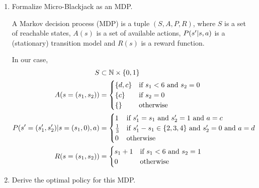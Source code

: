\documentclass[11pt, a4paper]{article}
\begin{document}
\begin{enumerate}
    \item Formalize Micro-Blackjack as an MDP.

    \begin{solution}
        A Markov decision process (MDP) is a tuple $(S, A, P, R)$, where $S$ is a set of reachable states, $A(s)$ is a set of available actions, $P(s' \vert s, a)$ is a (stationary) transition model and $R(s)$ is a reward function.

        In our case,
        \begin{align*}
            S & \subset \mathbb{N} \times \{0, 1\} \\
            A(s = (s_1, s_2)) & = \begin{cases}
                \{d, c\} & \text{if } s_1 < 6 \text{ and } s_2 = 0 \\
                \{c\} & \text{if } s_2 = 0 \\
                \{\} & \text{otherwise}
            \end{cases} \\
            P(s' = (s_1', s_2') \vert s = (s_1, 0), a) & = \begin{cases}
                1 & \text{if } s_1' = s_1 \text{ and } s_2' = 1 \text{ and } a = c \\
                \frac{1}{3} & \text{if } s_1' - s_1 \in \{2, 3, 4\} \text{ and } s_2' = 0 \text{ and } a = d \\
                0 & \text{otherwise}
            \end{cases} \\
            R(s = (s_1, s_2)) & = \begin{cases}
                s_1 + 1 & \text{if } s_1 < 6 \text{ and } s_2 = 1 \\
                0 & \text{otherwise}
            \end{cases}
        \end{align*}
    \end{solution}

    \item Derive the optimal policy for this MDP.


\end{enumerate}
\end{document}
